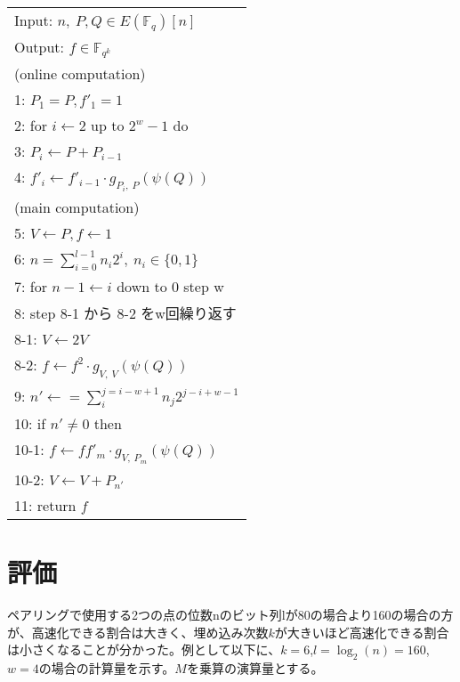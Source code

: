 \documentclass[twocolumn]{jsarticle} %
\begin{document}
\begin{longtable}
 \begin{center}
  \begin{tabular}{|l|}
     \hline
     Input: $n, \ P, Q \in E(\mathbb{F}_q)[n]$ \\
     Output: $f \in \mathbb{F}_{q^k}$  \\
     \hline
     (online computation) \\
     1: \quad $P_1 = P, f'_1=1 $\\
     2: \quad for $i \gets 2$ up to $2^w -1$ do\\
     3: \quad \quad $P_i \gets P + P_{i-1} $\\
     4: \quad \quad $f'_i \gets f'_{i-1} \cdot g_{P_i,\ P}(\psi (Q))$\\

     (main computation) \\
     5: \quad $V \gets P, f \gets 1 $\\
     6: \quad $n=\sum^{l - 1}_{i=0} n_i 2^i, \ n_i \in \{0,1\}$\\

     7: \quad for $ n-1 \gets i$ down to 0 step w\\
     8: \quad step 8-1 から 8-2 をw回繰り返す\\
     8-1: \quad \quad $V \gets 2V $\\
     8-2: \quad \quad $f \gets f^2 \cdot g_{V,\ V}(\psi (Q))$\\

     9: \quad $n' \gets =\sum^{j=i-w+1}_{i} n_{j}2^{j-i+w-1} $\\
     10: \quad if $n' \neq 0$ then\\
     10-1: \quad \quad $f \gets ff'_m \cdot g_{V,\ P_m}(\psi (Q))$ \\
     10-2: \quad \quad $V \gets V + P_{n'} $\\
     11: \quad return $f$\\
     \hline
  \end{tabular}
 \end{center}
\end{longtable}

\section{評価}
ペアリングで使用する2つの点の位数nのビット列lが80の場合より160の場合の方が、高速化できる割合は大きく、埋め込み次数$k$が大きいほど高速化できる割合は小さくなることが分かった。例として以下に、$k=6$,$l=\log_2(n)=160$, $w=4$の場合の計算量を示す。$M$を乗算の演算量とする。
\end{document}
